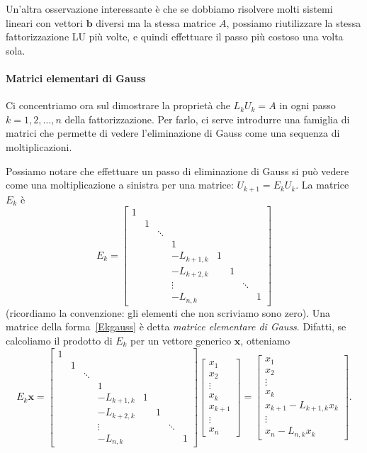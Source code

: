 \documentclass[a4paper]{report}
\theoremstyle{definition}
\theoremstyle{remark}
\renewcommand{\b}{\mathbf{b}}
\begin{document}
Un'altra osservazione interessante è che se dobbiamo risolvere molti sistemi lineari con vettori $\b$ diversi ma la stessa matrice $A$, possiamo riutilizzare la stessa fattorizzazione LU più volte, e quindi effettuare il passo più costoso una volta sola.

\paragraph{Matrici elementari di Gauss} Ci concentriamo ora sul dimostrare la proprietà che $L_k U_k = A$ in ogni passo $k=1,2,\dots,n$ della fattorizzazione. Per farlo, ci serve introdurre una famiglia di matrici che permette di vedere l'eliminazione di Gauss come una sequenza di moltiplicazioni.

Possiamo notare che effettuare un passo di eliminazione di Gauss si può vedere come una moltiplicazione a sinistra per una matrice: $U_{k+1} = E_k U_k$. La matrice $E_k$ è
\begin{equation} \label{Ekgauss}
E_k = \begin{bmatrix}
    1 \\
    & 1\\
    && \ddots\\
    & & & 1\\
    & & & -L_{k+1,k} & 1\\
    & & & -L_{k+2,k} & & 1\\
    & & & \vdots & & & \ddots \\
    & & & -L_{n,k} & & & & 1
\end{bmatrix}
\end{equation}
(ricordiamo la convenzione: gli elementi che non scriviamo sono zero). Una matrice della forma~\eqref{Ekgauss} è detta \emph{matrice elementare di Gauss}. Difatti, se calcoliamo il prodotto di $E_k$ per un vettore generico $\mathbf{x}$, otteniamo
\[
E_k \mathbf{x} = \begin{bmatrix}
    1 \\
    & 1\\
    && \ddots\\
    & & & 1\\
    & & & -L_{k+1,k} & 1\\
    & & & -L_{k+2,k} & & 1\\
    & & & \vdots & & & \ddots \\
    & & & -L_{n,k} & & & & 1
\end{bmatrix}
\begin{bmatrix}
    x_1\\
    x_2\\
    \vdots\\
    x_k\\
    x_{k+1}\\
    \vdots\\
    x_n
\end{bmatrix} = \begin{bmatrix}
    x_1\\
    x_2\\
    \vdots\\
    x_k\\
    x_{k+1} - L_{k+1,k}x_k\\
    \vdots\\
    x_n - L_{n,k}x_k
\end{bmatrix}.
\]
\end{document}
